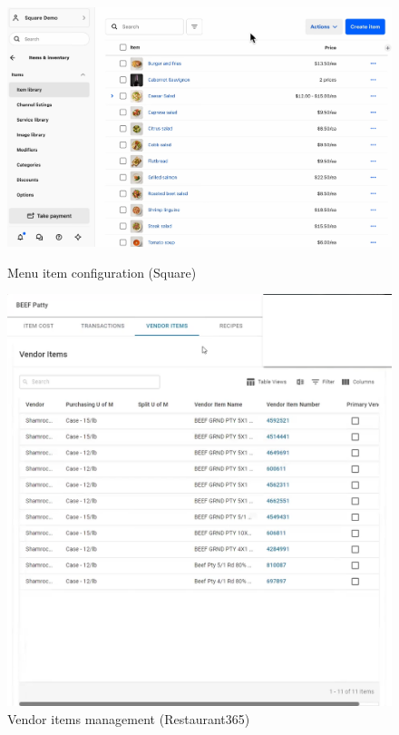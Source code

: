 \documentclass[]{VUMIFTemplateClass}
\begin{document}
\begin{figure}[h]
    \centering
    \begin{minipage}{0.48\textwidth}
        \centering
        \includegraphics[width=\textwidth]{images/examples/item_menu_square.png}
        \caption{Menu item configuration (Square)}
    \end{minipage}
    \hfill
    \begin{minipage}{0.48\textwidth}
        \centering
        \includegraphics[width=\textwidth]{images/examples/item_vendor_items_r365.png}
        \caption{Vendor items management (Restaurant365)}
    \end{minipage}
\end{figure}
\end{document}
